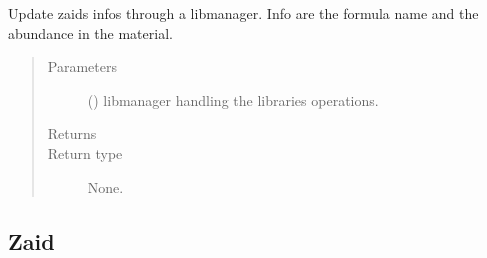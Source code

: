 \documentclass[letterpaper,10pt,english]{sphinxmanual}
\begin{document}
\begin{fulllineitems}
\begin{fulllineitems}
\label{\detokenize{api/inputgeneration:matreader.Element.update_zaidinfo}}
Update zaids infos through a libmanager. Info are the formula name and
the abundance in the material.
\begin{quote}\begin{description}
\item[{Parameters}] \leavevmode
{} ({\hyperref[\detokenize{api/initobjects:libmanager.LibManager}]{}}) \textendash{} libmanager handling the libraries operations.

\item[{Returns}] \leavevmode


\item[{Return type}] \leavevmode
None.

\end{description}\end{quote}

\end{fulllineitems}


\end{fulllineitems}



\subsection{Zaid}
\label{\detokenize{api/inputgeneration:zaid}}
\end{document}
